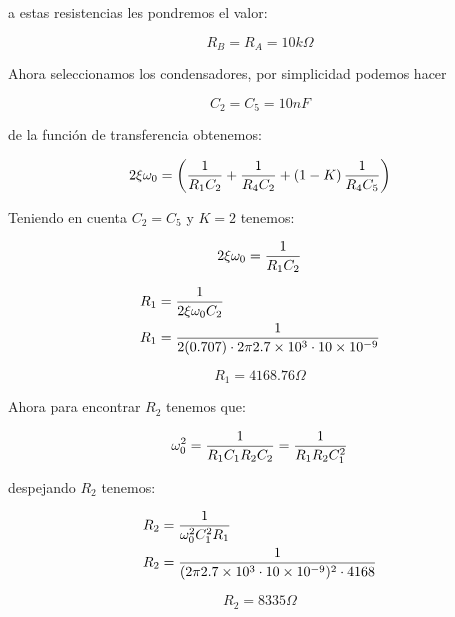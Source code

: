 a estas resistencias les pondremos el valor:

\begin{equation*}
    \boxed{R_B = R_A = 10k\Omega}
\end{equation*}

Ahora seleccionamos los condensadores, por simplicidad podemos hacer

\begin{equation*}
    \boxed{C_2 = C_5 = 10nF}
\end{equation*}

de la función de transferencia obtenemos:

\begin{equation}
    2\xi \omega_0 = \left(\frac{1}{R_1 C_2} + \frac{1}{R_4 C_2} + \left(1 - K\right) \frac{1}{R_4 C_5}\right)
\end{equation}

Teniendo en cuenta $C_2 = C_5$ y $K=2$ tenemos:

\begin{equation}
    2\xi \omega_0 = \frac{1}{R_1 C_2}
\end{equation}

\begin{align*}
    R_1 &= \frac{1}{2\xi \omega_0 C_2} \\
    R_1 &= \frac{1}{2 (0.707) \cdot 2\pi 2.7\times 10^3 \cdot 10\times 10 ^{-9}}
\end{align*}

\begin{equation*}
    R_1 = 4168.76 \Omega
\end{equation*}

Ahora para encontrar $R_2$ tenemos que:

\begin{equation}
    \omega_0^2 = \frac{1}{R_1 C_1 R_2 C_2} = \frac{1}{R_1 R_2 C_1^2}
\end{equation}

despejando $R_2$ tenemos:

\begin{align*}
    R_2 &= \frac{1}{\omega_0^2 C_1^2 R_1} \\
    R_2 &= \frac{1}{(2\pi 2.7\times 10^3 \cdot 10\times 10^{-9})^2 \cdot 4168} \\
\end{align*}

\begin{equation*}
    \boxed{R_2 = 8335 \Omega}
\end{equation*}


